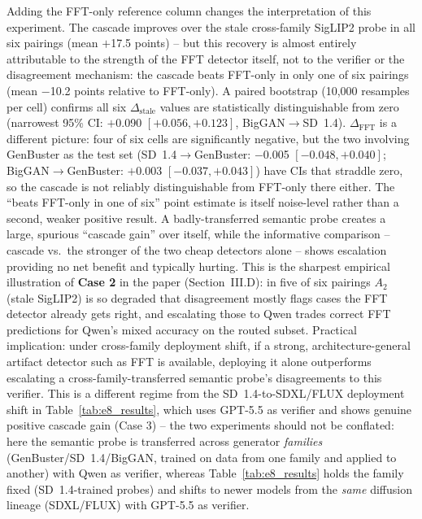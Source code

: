 \documentclass{ieeeaccess}
\begin{document}
Adding the FFT-only reference column changes the interpretation of this experiment. The
cascade improves over the stale cross-family SigLIP2 probe in all six pairings (mean
$+$17.5 points) -- but this recovery is almost entirely attributable to the strength of
the FFT detector itself, not to the verifier or the disagreement mechanism: the cascade
beats FFT-only in only one of six pairings (mean $-$10.2 points relative to FFT-only).
A paired bootstrap (10,000 resamples per cell) confirms all six $\Delta_{\text{stale}}$
values are statistically distinguishable from zero (narrowest 95\% CI: $+$0.090
$[+0.056, +0.123]$, BigGAN$\to$SD~1.4). $\Delta_{\text{FFT}}$ is a different picture:
four of six cells are significantly negative, but the two involving GenBuster as the
test set (SD~1.4$\to$GenBuster: $-$0.005 $[-0.048, +0.040]$; BigGAN$\to$GenBuster:
$+$0.003 $[-0.037, +0.043]$) have CIs that straddle zero, so the cascade is not
reliably distinguishable from FFT-only there either. The ``beats FFT-only in one of
six'' point estimate is itself noise-level rather than a second, weaker positive result.
A badly-transferred semantic probe creates a large, spurious ``cascade gain'' over
itself, while the informative comparison -- cascade vs.\ the stronger of the two cheap
detectors alone -- shows escalation providing no net benefit and typically hurting. This
is the sharpest empirical illustration of \textbf{Case 2} in the paper (Section~III.D):
in five of six pairings $A_{2}$ (stale SigLIP2) is so degraded that disagreement mostly
flags cases the FFT detector already gets right, and escalating those to Qwen trades
correct FFT predictions for Qwen's mixed accuracy on the routed subset. Practical
implication: under cross-family deployment shift, if a strong, architecture-general
artifact detector such as FFT is available, deploying it alone outperforms escalating a
cross-family-transferred semantic probe's disagreements to this verifier. This is a
different regime from the SD~1.4-to-SDXL/FLUX deployment shift in
Table~\ref{tab:e8_results}, which uses GPT-5.5 as verifier and shows genuine positive
cascade gain (Case 3) -- the two experiments should not be conflated: here the semantic
probe is transferred across generator \emph{families} (GenBuster/SD~1.4/BigGAN, trained
on data from one family and applied to another) with Qwen as verifier, whereas
Table~\ref{tab:e8_results} holds the family fixed (SD~1.4-trained probes) and shifts to
newer models from the \emph{same} diffusion lineage (SDXL/FLUX) with GPT-5.5 as verifier.
\end{document}
